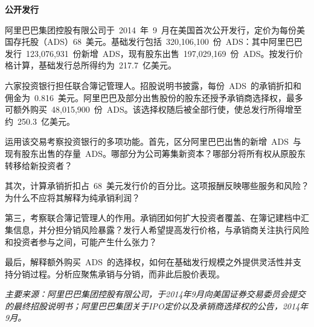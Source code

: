 

\textbf{公开发行}

阿里巴巴集团控股有限公司于~2014~年~9~月在美国首次公开发行，定价为每份美国存托股（ADS）68~美元。基础发行包括~320,106,100~份~ADS：其中阿里巴巴发行~123,076,931~份新增~ADS，现有股东出售~197,029,169~份~ADS。按发行价格计算，基础发行总所得约为~217.7~亿美元。

六家投资银行担任联合簿记管理人。招股说明书披露，每份~ADS~的承销折扣和佣金为~0.816~美元。阿里巴巴及部分出售股份的股东还授予承销商选择权，最多可额外购买~48,015,900~份~ADS。该选择权随后被全部行使，使总发行所得增至约~250.3~亿美元。

运用该交易考察投资银行的多项功能。首先，区分阿里巴巴出售的新增~ADS~与现有股东出售的存量~ADS。哪部分为公司筹集新资本？哪部分将所有权从原股东转移给新投资者？

其次，计算承销折扣占~68~美元发行价的百分比。这项报酬反映哪些服务和风险？为什么不应将其解释为纯承销利润？

第三，考察联合簿记管理人的作用。承销团如何扩大投资者覆盖、在簿记建档中汇集信息，并分担分销风险暴露？发行人希望提高发行价格，与承销商关注执行风险和投资者参与之间，可能产生什么张力？

最后，解释额外购买~ADS~的选择权，如何在基础发行规模之外提供灵活性并支持分销过程。分析应聚焦承销与分销，而非此后股价表现。

\emph{主要来源：阿里巴巴集团控股有限公司，于2014年9月向美国证券交易委员会提交的最终招股说明书；阿里巴巴集团关于IPO定价以及承销商选择权的公告，2014年9月。}



